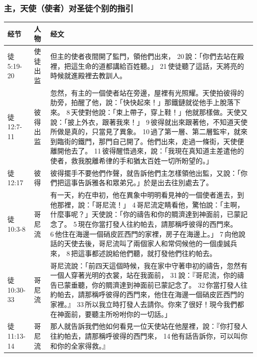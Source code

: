 \subsubsection{主，天使（使者）对圣徒个别的指引}
\begin{table}[H]
\centering
\begin{tabular}{p{5em}p{2.4em}p{40em}}  \toprule
经节&人物&经文 \\  \midrule
徒5:19-20&使徒出监&但主的使者夜間開了監門，領他們出來， 20 說：「你們去站在殿裡，把這生命的道都講給百姓聽。」 21 使徒聽了這話，天將亮的時候就進殿裡去教訓人。\\  \midrule
徒12:7-11&彼得出监&忽然，有主的一個使者站在旁邊，屋裡有光照耀。天使拍彼得的肋旁，拍醒了他，說：「快快起來！」那鐵鏈就從他手上脫落下來。 8 天使對他說：「束上帶子，穿上鞋！」他就那樣做。天使又說：「披上外衣，跟著我來！」 9 彼得就出來跟著他，不知道天使所做是真的，只當見了異象。 10 過了第一層、第二層監牢，就來到臨街的鐵門，那門自己開了。他們出來，走過一條街，天使便離開他去了。 11 彼得醒悟過來，說：「我現在真知道主差遣他的使者，救我脫離希律的手和猶太百姓一切所盼望的。」\\  \midrule

徒12:17&彼得&彼得擺手不要他們作聲，就告訴他們主怎樣領他出監，又說：「你們把這事告訴雅各和眾弟兄。」於是出去往別處去了。\\  \midrule

徒10:3-8&哥尼流&有一天，約在申初，他在異象中明明看見神的一個使者進去，到他那裡，說：「哥尼流！」 4 哥尼流定睛看他，驚怕說：「主啊，什麼事呢？」天使說：「你的禱告和你的賙濟達到神面前，已蒙記念了。 5 現在你當打發人往約帕去，請那稱呼彼得的西門來。 6 他住在海邊一個硝皮匠西門的家裡，房子在海邊上。」 7 向他說話的天使去後，哥尼流叫了兩個家人和常伺候他的一個虔誠兵來， 8 把這事都述說給他們聽，就打發他們往約帕去。\\  \midrule

徒10:30-33&哥尼流&哥尼流說：「前四天這個時候，我在家中守著申初的禱告，忽然有一個人穿著光明的衣裳，站在我面前， 31 說：『哥尼流，你的禱告已蒙垂聽，你的賙濟達到神面前已蒙記念了。 32 你當打發人往約帕去，請那稱呼彼得的西門來，他住在海邊一個硝皮匠西門的家裡。』 33 所以我立時打發人去請你。你來了很好！現今我們都在神面前，要聽主所吩咐你的一切話。」\\  \midrule

徒11:13-14&哥尼流&那人就告訴我們他如何看見一位天使站在他屋裡，說：『你打發人往約帕去，請那稱呼彼得的西門來， 14 他有話告訴你，可以叫你和你的全家得救。』\\  \midrule





\end{tabular}
\end{table}
